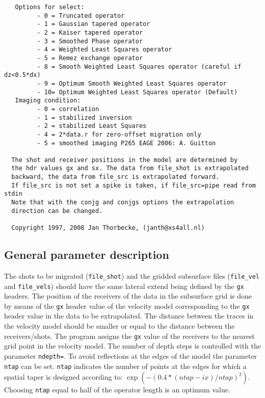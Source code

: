{\begin{verbatim}
   Options for select:
         - 0 = Truncated operator
         - 1 = Gaussian tapered operator
         - 2 = Kaiser tapered operator
         - 3 = Smoothed Phase operator
         - 4 = Weighted Least Squares operator
         - 5 = Remez exchange operator
         - 8 = Smooth Weighted Least Squares operator (careful if dz<0.5*dx)
         - 9 = Optimum Smooth Weighted Least Squares operator
         - 10= Optimum Weighted Least Squares operator (Default)
   Imaging condition:
         - 0 = correlation
         - 1 = stabilized inversion
         - 2 = stabilized Least Squares
         - 4 = 2*data.r for zero-offset migration only
         - 5 = smoothed imaging P265 EAGE 2006: A. Guitton
 
  The shot and receiver positions in the model are determined by
  the hdr values gx and sx. The data from file_shot is extrapolated 
  backward, the data from file_src is extrapolated forward.
  If file_src is not set a spike is taken, if file_src=pipe read from stdin
  Note that with the conjg and conjgs options the extrapolation 
  direction can be changed.
 
  Copyright 1997, 2008 Jan Thorbecke, (janth@xs4all.nl) 

\end{verbatim}}

\subsection{General parameter description}

The shots to be migrated ({\tt file\_shot}) and the gridded subsurface files ({\tt file\_vel} and {\tt file\_vels}) should have the same lateral extend being defined by the {\tt gx} headers.  The position of the receivers of the data in the subsurface grid is done by means of the {\tt gx} header value of the velocity model corresponding to the {\tt gx} header value in the data to be extrapolated. The distance between the traces in the velocity model should be smaller or equal to the distance between the receivers/shots. The program assigns the {\tt gx} value of the receivers to the nearest grid point in the velocity model. The number of depth steps is controlled with the parameter {\tt ndepth=}. To avoid reflections at the edges of the model the parameter {\tt ntap} can be set. {\tt ntap} indicates the number of points at the edges for which a spatial taper is designed according to: $\exp{(-(0.4*(ntap-ix)/ntap)^2)}$. Choosing {\tt ntap} equal to half of the operator length is an optimum value. 
 
